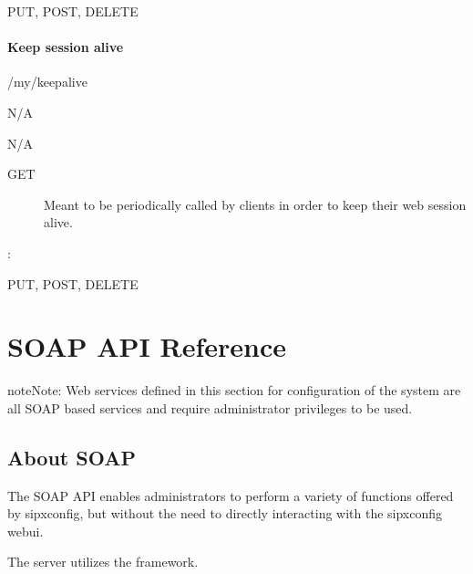 \documentclass[letterpaper,10pt,english]{sphinxmanual}
\begin{document}
 PUT, POST, DELETE


\subsubsection{Keep session alive}
\label{\detokenize{restapi:keep-session-alive}}
 /my/keepalive

 N/A

 N/A
\begin{description}
\item[{ GET}] \leavevmode
Meant to be periodically called by clients in order to keep their web session alive.

\end{description}

:

\begin{sphinxVerbatim}[commandchars=\\\{\}]
\end{sphinxVerbatim}

 PUT, POST, DELETE

\ignorespaces 

\chapter{SOAP API Reference}
\label{\detokenize{soapapi:soap-api-reference}}\label{\detokenize{soapapi:index-0}}\label{\detokenize{soapapi:id1}}\label{\detokenize{soapapi::doc}}
\begin{sphinxadmonition}{note}{Note:}
Web services defined in this section for configuration of the system are all SOAP based services and require administrator privileges to be used.
\end{sphinxadmonition}


\section{About SOAP}
\label{\detokenize{soapapi:about-soap}}
The SOAP API enables administrators to perform a variety of functions offered by sipxconfig, but without the need to directly interacting with the sipxconfig webui.

The server utilizes the  framework.
\end{document}
